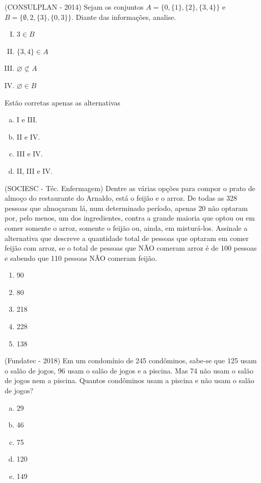 \begin{exer}
 (CONSULPLAN - 2014) Sejam os conjuntos $A = \{0, \{1\}, \{2\}, \{3, 4\}\}$ e $B = \{\emptyset, 2, \{3\}, \{0, 3\}\}$. Diante das informações, analise.
 \begin{multicols}{2}
 \begin{enumerate}[I)]
  \item $3 \in B$
  \item $\{3, 4\} \in A$
  \item $\varnothing \not\subset A$
  \item $\varnothing \in B$
 \end{enumerate}
 \end{multicols}
 Estão corretas apenas as alternativas
 \begin{multicols}{2}
 \begin{enumerate}[a)]
 \item I e III.
 \item II e IV.
 \item III e IV.
 \item II, III e IV.
 \end{enumerate}
 \end{multicols}
\end{exer}

\begin{exer}
(SOCIESC - Téc. Enfermagem) Dentre as várias opções para compor o prato de almoço do restaurante do Arnaldo, está o feijão e o arroz. De todas as 328 pessoas que almoçaram lá, num determinado período, apenas 20 não optaram por, pelo menos, um dos ingredientes, contra a grande maioria que optou ou em comer somente o arroz, somente o feijão ou, ainda, em misturá-los. Assinale a alternativa que descreve a quantidade total de pessoas que optaram em comer feijão com arroz, se o total de pessoas que NÃO comeram arroz é de 100 pessoas e sabendo que 110 pessoas NÃO comeram feijão.
  \begin{enumerate}
  \item 90
  \item 80
  \item 218
  \item 228
  \item 138
 \end{enumerate}
 \end{exer}

 \begin{exer}
(Fundatec - 2018) Em um condomínio de 245 condôminos, sabe-se que 125 usam o salão de jogos, 96 usam o salão de jogos e a piscina. Mas 74 não usam o salão de jogos nem a piscina. Quantos condôminos usam a piscina e não usam o salão de jogos?
\begin{multicols}{5}
\begin{enumerate}[a)]
\item 29
\item 46
\item 75
\item 120
\item 149
\end{enumerate}
\end{multicols}
\end{exer}

